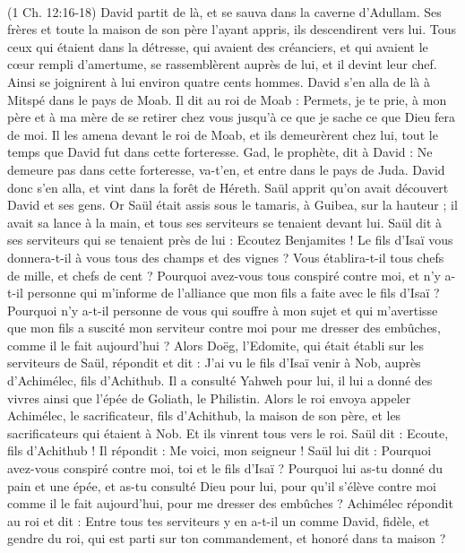 \begin{multicols}{2}
{\\(1 Ch. 12:16-18)}
\VerseOne{}David partit de là, et se sauva dans la caverne d'Adullam. Ses frères et toute la maison de son père l’ayant appris, ils descendirent vers lui.
Tous ceux qui étaient dans la détresse, qui avaient des créanciers, et qui avaient le cœur rempli d'amertume, se rassemblèrent auprès de lui, et il devint leur chef. Ainsi se joignirent à lui environ quatre cents hommes.
David s'en alla de là à Mitspé dans le pays de Moab. Il dit au roi de Moab : Permets, je te prie, à mon père et à ma mère de se retirer chez vous jusqu'à ce que je sache ce que Dieu fera de moi.
Il les amena devant le roi de Moab, et ils demeurèrent chez lui, tout le temps que David fut dans cette forteresse.
Gad, le prophète, dit à David : Ne demeure pas dans cette forteresse, va-t'en, et entre dans le pays de Juda. David donc s'en alla, et vint dans la forêt de Héreth.
Saül apprit qu'on avait découvert David et ses gens. Or Saül était assis sous le tamaris, à Guibea, sur la hauteur ; il avait sa lance à la main, et tous ses serviteurs se tenaient devant lui.
Saül dit à ses serviteurs qui se tenaient près de lui : Ecoutez Benjamites ! Le fils d'Isaï vous donnera-t-il à vous tous des champs et des vignes ? Vous établira-t-il tous chefs de mille, et chefs de cent ?
Pourquoi avez-vous tous conspiré contre moi, et n'y a-t-il personne qui m’informe de l’alliance que mon fils a faite avec le fils d'Isaï ? Pourquoi n’y a-t-il personne de vous qui souffre à mon sujet et qui m'avertisse que mon fils a suscité mon serviteur contre moi pour me dresser des embûches, comme il le fait aujourd'hui ?
Alors Doëg, l’Edomite, qui était établi sur les serviteurs de Saül, répondit et dit : J'ai vu le fils d'Isaï venir à Nob, auprès d’Achimélec, fils d'Achithub.
Il a consulté Yahweh pour lui, il lui a donné des vivres ainsi que l'épée de Goliath, le Philistin.
Alors le roi envoya appeler Achimélec, le sacrificateur, fils d'Achithub, la maison de son père, et les sacrificateurs qui étaient à Nob. Et ils vinrent tous vers le roi.
Saül dit : Ecoute, fils d'Achithub ! Il répondit : Me voici, mon seigneur !
Saül lui dit : Pourquoi avez-vous conspiré contre moi, toi et le fils d'Isaï ? Pourquoi lui as-tu donné du pain et une épée, et as-tu consulté Dieu pour lui, pour qu'il s'élève contre moi comme il le fait aujourd'hui, pour me dresser des embûches ?
Achimélec répondit au roi et dit : Entre tous tes serviteurs y en a-t-il un comme David, fidèle, et gendre du roi, qui est parti sur ton commandement, et honoré dans ta maison ?

\end{multicols}

